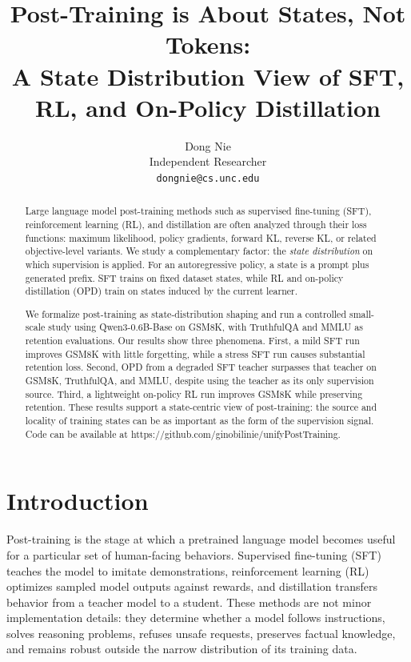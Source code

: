 \documentclass{article}
\title{Post-Training is About States, Not Tokens:\\
A State Distribution View of SFT, RL, and On-Policy Distillation}
\author{%
  Dong Nie\\
  Independent Researcher\\
  \texttt{dongnie@cs.unc.edu} \\
}
\begin{document}
\maketitle

\begin{abstract}
Large language model post-training methods such as supervised fine-tuning (SFT),
reinforcement learning (RL), and distillation are often analyzed through their
loss functions: maximum likelihood, policy gradients, forward KL, reverse KL, or
related objective-level variants. We study a complementary factor: the
\emph{state distribution} on which supervision is applied. For an autoregressive
policy, a state is a prompt plus generated prefix. SFT trains on fixed dataset
states, while RL and on-policy distillation (OPD) train on states induced by the
current learner.

We formalize post-training as state-distribution shaping and run a controlled
small-scale study using Qwen3-0.6B-Base on GSM8K, with TruthfulQA and MMLU as
retention evaluations. Our results show three phenomena. First, a mild SFT run
improves GSM8K with little forgetting, while a stress SFT run causes substantial
retention loss. Second, OPD from a degraded SFT teacher surpasses that teacher
on GSM8K, TruthfulQA, and MMLU, despite using the teacher as its only
supervision source. Third, a lightweight on-policy RL run improves GSM8K while
preserving retention. These results support a state-centric view of
post-training: the source and locality of training states can be as important as
the form of the supervision signal. Code can be available at https://github.com/ginobilinie/unifyPostTraining.
\end{abstract}

\section{Introduction}

Post-training is the stage at which a pretrained language model becomes useful
for a particular set of human-facing behaviors. Supervised fine-tuning (SFT)
teaches the model to imitate demonstrations, reinforcement learning (RL)
optimizes sampled model outputs against rewards, and distillation transfers
behavior from a teacher model to a student. These methods are not minor
implementation details: they determine whether a model follows instructions,
solves reasoning problems, refuses unsafe requests, preserves factual knowledge,
and remains robust outside the narrow distribution of its training data.
\end{document}
